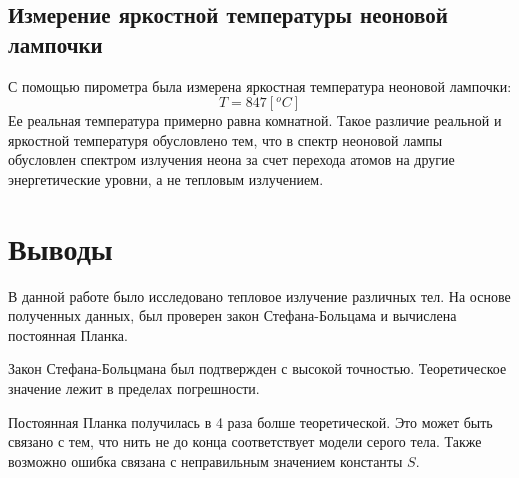 \documentclass[a4paper,12pt]{article} %
\begin{document}
		\subsection{Измерение яркостной температуры неоновой лампочки}

			С помощью пирометра была измерена яркостная температура неоновой лампочки:
			\begin{equation}
				T = 847 [^oC]
			\end{equation}
			Ее реальная температура примерно равна комнатной.
			Такое различие реальной и яркостной температуря обусловлено тем, что в спектр неоновой лампы обусловлен спектром излучения неона за счет перехода атомов на другие энергетические уровни,
			а не тепловым излучением.
		
	\section{Выводы}
			
		В данной работе было исследовано тепловое излучение различных тел. 
		На основе полученных данных, был проверен закон Стефана-Больцама и вычислена постоянная Планка.\par
		Закон Стефана-Больцмана был подтвержден с высокой точностью. 
		Теоретическое значение лежит в пределах погрешности.\par
		Постоянная Планка получилась в 4 раза болше теоретической. 
		Это может быть связано с тем, что нить не до конца соответствует модели серого тела. 
		Также возможно ошибка связана с неправильным значением константы $S$.  
	
\end{document}
